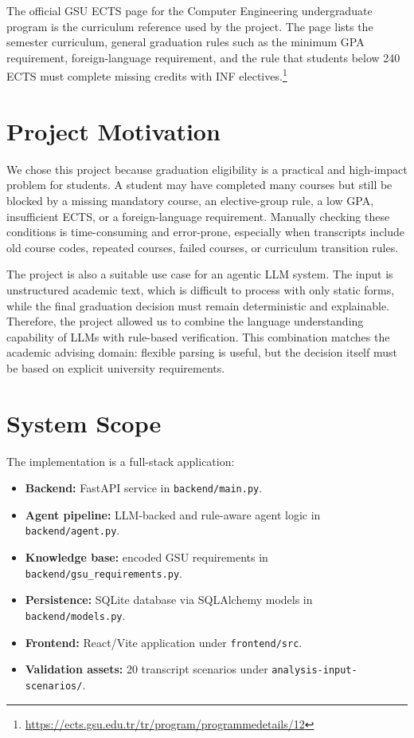 \documentclass[11pt,a4paper]{article}
\begin{document}
The official GSU ECTS page for the Computer Engineering undergraduate program
is the curriculum reference used by the project. The page lists the semester
curriculum, general graduation rules such as the minimum GPA requirement,
foreign-language requirement, and the rule that students below 240 ECTS must
complete missing credits with INF electives.\footnote{\url{https://ects.gsu.edu.tr/tr/program/programmedetails/12}}

\section{Project Motivation}

We chose this project because graduation eligibility is a practical and
high-impact problem for students. A student may have completed many courses but
still be blocked by a missing mandatory course, an elective-group rule, a low
GPA, insufficient ECTS, or a foreign-language requirement. Manually checking
these conditions is time-consuming and error-prone, especially when transcripts
include old course codes, repeated courses, failed courses, or curriculum
transition rules.

The project is also a suitable use case for an agentic LLM system. The input is
unstructured academic text, which is difficult to process with only static
forms, while the final graduation decision must remain deterministic and
explainable. Therefore, the project allowed us to combine the language
understanding capability of LLMs with rule-based verification. This combination
matches the academic advising domain: flexible parsing is useful, but the
decision itself must be based on explicit university requirements.

\section{System Scope}

The implementation is a full-stack application:

\begin{itemize}
  \item \textbf{Backend:} FastAPI service in \texttt{backend/main.py}.
  \item \textbf{Agent pipeline:} LLM-backed and rule-aware agent logic in
  \texttt{backend/agent.py}.
  \item \textbf{Knowledge base:} encoded GSU requirements in
  \texttt{backend/gsu\_requirements.py}.
  \item \textbf{Persistence:} SQLite database via SQLAlchemy models in
  \texttt{backend/models.py}.
  \item \textbf{Frontend:} React/Vite application under \texttt{frontend/src}.
  \item \textbf{Validation assets:} 20 transcript scenarios under
  \texttt{analysis-input-scenarios/}.
\end{itemize}
\end{document}
